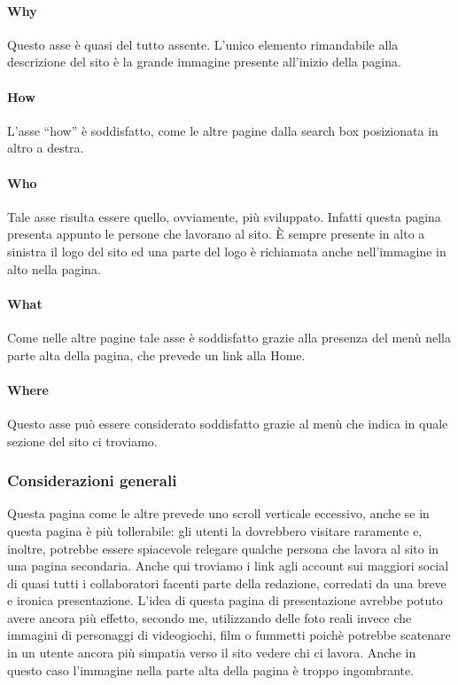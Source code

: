 \documentclass[../ProgettoTecWeb2.tex]{subfiles}
\begin{document}
			\paragraph{Why}
			Questo asse è quasi del tutto assente. L'unico elemento rimandabile alla descrizione del sito è la grande immagine presente all'inizio della pagina.

			\paragraph{How}
			L'asse ``how'' è soddisfatto, come le altre pagine dalla search box posizionata in altro a destra.
			
			\paragraph{Who}
			Tale asse risulta essere quello, ovviamente, più sviluppato. Infatti questa pagina presenta appunto le persone che lavorano al sito. È sempre presente in alto a sinistra il logo del sito ed una parte del logo è richiamata anche nell'immagine in alto nella pagina.

			\paragraph{What}
			Come nelle altre pagine tale asse è soddisfatto grazie alla presenza del menù nella parte alta della pagina, che prevede un link alla Home.

			\paragraph{Where}
			Questo asse può essere considerato soddisfatto grazie al menù che indica in quale sezione del sito ci troviamo.
		
		\subsubsection{Considerazioni generali}
		Questa pagina come le altre prevede uno scroll verticale eccessivo, anche se in questa pagina è più tollerabile: gli utenti la dovrebbero visitare raramente e, inoltre, potrebbe essere spiacevole relegare qualche persona che lavora al sito in una pagina secondaria. Anche qui troviamo i link agli account sui maggiori social di quasi tutti i collaboratori facenti parte della redazione, corredati da una breve e ironica presentazione. L'idea di questa pagina di presentazione avrebbe potuto avere ancora più effetto, secondo me, utilizzando delle foto reali invece che immagini di personaggi di videogiochi, film o fummetti poichè potrebbe scatenare in un utente ancora più simpatia verso il sito vedere chi ci lavora. Anche in questo caso l'immagine nella parte alta della pagina è troppo ingombrante.
\end{document}
